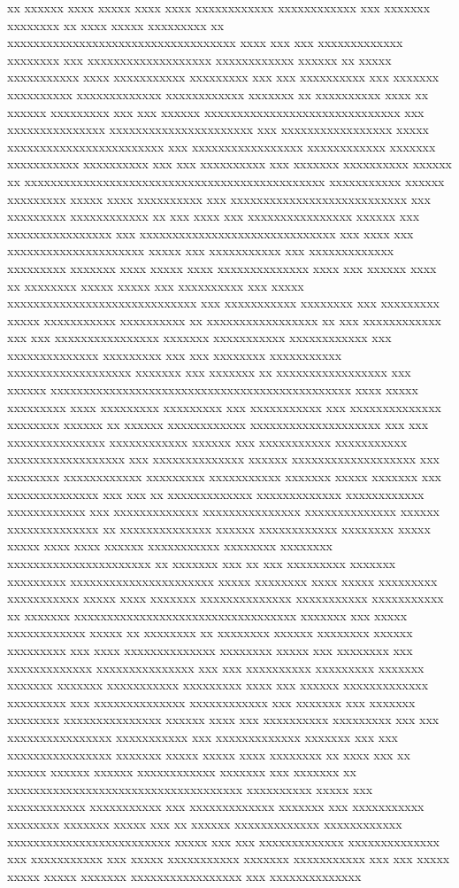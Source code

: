 xx xxxxxx xxxx xxxxx xxxx xxxx xxxxxxxxxxxx xxxxxxxxxxxx xxx xxxxxxx xxxxxxxx xx xxxx xxxxx xxxxxxxxx xx xxxxxxxxxxxxxxxxxxxxxxxxxxxxxxxxxxx xxxx xxx xxx xxxxxxxxxxxxx xxxxxxxx xxx xxxxxxxxxxxxxxxxxxx xxxxxxxxxxxx xxxxxx xx xxxxx xxxxxxxxxxx xxxx xxxxxxxxxxx xxxxxxxxx xxx xxx xxxxxxxxxx xxx xxxxxxx xxxxxxxxxx xxxxxxxxxxxxx xxxxxxxxxxxx xxxxxxx xx xxxxxxxxxx xxxx xx xxxxxx xxxxxxxxx xxx xxx xxxxxx xxxxxxxxxxxxxxxxxxxxxxxxxxxxxx xxx xxxxxxxxxxxxxxx xxxxxxxxxxxxxxxxxxxxxx xxx xxxxxxxxxxxxxxxxx xxxxx xxxxxxxxxxxxxxxxxxxxxxxx xxx xxxxxxxxxxxxxxxxx xxxxxxxxxxxx xxxxxxx xxxxxxxxxxx xxxxxxxxxx xxx xxx xxxxxxxxxx xxx xxxxxxx xxxxxxxxxx xxxxxx xx xxxxxxxxxxxxxxxxxxxxxxxxxxxxxxxxxxxxxxxxxxxxxx xxxxxxxxxxx xxxxxx xxxxxxxxx xxxxx xxxx xxxxxxxxxx xxx xxxxxxxxxxxxxxxxxxxxxxxxxxx xxx xxxxxxxxx xxxxxxxxxxxx xx xxx xxxx xxx xxxxxxxxxxxxxxxx xxxxxx xxx xxxxxxxxxxxxxxxx xxx xxxxxxxxxxxxxxxxxxxxxxxxxxxxxx xxx xxxx xxx xxxxxxxxxxxxxxxxxxxxx xxxxx xxx xxxxxxxxxxx xxx xxxxxxxxxxxxx xxxxxxxxx xxxxxxx xxxx xxxxx xxxx xxxxxxxxxxxxxx xxxx xxx xxxxxx xxxx xx xxxxxxxx xxxxx xxxxx xxx xxxxxxxxxx xxx xxxxx xxxxxxxxxxxxxxxxxxxxxxxxxxxxx xxx xxxxxxxxxxx xxxxxxxx xxx xxxxxxxxx xxxxx xxxxxxxxxxx xxxxxxxxxx xx xxxxxxxxxxxxxxxxx xx xxx xxxxxxxxxxxx xxx xxx xxxxxxxxxxxxxxxx xxxxxxx xxxxxxxxxxx xxxxxxxxxxxx xxx xxxxxxxxxxxxxx xxxxxxxxx xxx xxx xxxxxxxx xxxxxxxxxxx xxxxxxxxxxxxxxxxxxx xxxxxxx xxx xxxxxxx xx xxxxxxxxxxxxxxxxx xxx xxxxxx xxxxxxxxxxxxxxxxxxxxxxxxxxxxxxxxxxxxxxxxxxxxxx xxxx xxxxx xxxxxxxxx xxxx xxxxxxxxx xxxxxxxxx xxx xxxxxxxxxxx xxx xxxxxxxxxxxxxx xxxxxxxx xxxxxx xx xxxxxx xxxxxxxxxxxx xxxxxxxxxxxxxxxxxxxx xxx xxx xxxxxxxxxxxxxxx xxxxxxxxxxxx xxxxxx xxx xxxxxxxxxxx xxxxxxxxxxx xxxxxxxxxxxxxxxxxx xxx xxxxxxxxxxxxxx xxxxxx xxxxxxxxxxxxxxxxxxx xxx xxxxxxxx xxxxxxxxxxxx xxxxxxxxx xxxxxxxxxxx xxxxxxx xxxxx xxxxxxx xxx xxxxxxxxxxxxxx xxx xxx xx xxxxxxxxxxxxx xxxxxxxxxxxxx xxxxxxxxxxxx xxxxxxxxxxxx xxx xxxxxxxxxxxxx xxxxxxxxxxxxxxx xxxxxxxxxxxxxx xxxxxx xxxxxxxxxxxxxx xx xxxxxxxxxxxxxx xxxxxx xxxxxxxxxxxx xxxxxxxx xxxxx xxxxx xxxx xxxx xxxxxx xxxxxxxxxxx xxxxxxxx xxxxxxxx xxxxxxxxxxxxxxxxxxxxxx xx xxxxxxx xxx xx xxx xxxxxxxxx xxxxxxx xxxxxxxxx xxxxxxxxxxxxxxxxxxxxxx xxxxx xxxxxxxx xxxx xxxxx xxxxxxxxx xxxxxxxxxxx xxxxx xxxx xxxxxxx xxxxxxxxxxxxxx xxxxxxxxxxx xxxxxxxxxxx xx xxxxxxx xxxxxxxxxxxxxxxxxxxxxxxxxxxxxxxxxx xxxxxxx xxx xxxxx xxxxxxxxxxxx xxxxx xx xxxxxxxx xx xxxxxxxx xxxxxx xxxxxxxx xxxxxx xxxxxxxxx xxx xxxx xxxxxxxxxxxxxx xxxxxxxx xxxxx xxx xxxxxxxx xxx xxxxxxxxxxxxx xxxxxxxxxxxxxxx xxx xxx xxxxxxxxxx xxxxxxxxx xxxxxxx xxxxxxx xxxxxxx xxxxxxxxxxx xxxxxxxxx xxxx xxx xxxxxx xxxxxxxxxxxxx xxxxxxxxx xxx xxxxxxxxxxxxxx xxxxxxxxxxxx xxx xxxxxxx xxx xxxxxxx xxxxxxxx xxxxxxxxxxxxxxx xxxxxx xxxx xxx xxxxxxxxxx xxxxxxxxx xxx xxx xxxxxxxxxxxxxxxx xxxxxxxxxxx xxx xxxxxxxxxxxxx xxxxxxx xxx xxx xxxxxxxxxxxxxxxx xxxxxxx xxxxx xxxxx xxxx xxxxxxxx xx xxxx xxx xx xxxxxx xxxxxx xxxxxx xxxxxxxxxxxx xxxxxxx xxx xxxxxxx xx xxxxxxxxxxxxxxxxxxxxxxxxxxxxxxxxxxxx xxxxxxxxxx xxxxx xxx xxxxxxxxxxxx xxxxxxxxxxx xxx xxxxxxxxxxxxx xxxxxxx xxx xxxxxxxxxxx xxxxxxxx xxxxxxx xxxxx xxx xx xxxxxx xxxxxxxxxxxxx xxxxxxxxxxxx xxxxxxxxxxxxxxxxxxxxxxxxx xxxxx xxx xxx xxxxxxxxxxxxx xxxxxxxxxxxxxx xxx xxxxxxxxxxx xxx xxxxx xxxxxxxxxxx xxxxxxx xxxxxxxxxxx xxx xxx xxxxx xxxxx xxxxx xxxxxxx xxxxxxxxxxxxxxxxx xxx xxxxxxxxxxxxxx 